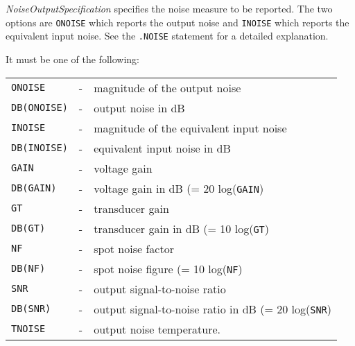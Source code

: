 \begin{widelist}
\item[{\it NoiseOutputSpecification}]
     specifies the noise measure to be reported. The two options are
     {\tt ONOISE} which reports the output noise and
     {\tt INOISE} which reports the equivalent input noise.
     See the {\tt .NOISE} statement
     for a detailed explanation.

     It  must be one of the following:\\
      \offset\begin{tabular}{lcp{3.5in}}
      {\tt ONOISE} &-&magnitude of the output noise\\
      {\tt DB(ONOISE)} &-&output noise in dB\\
      {\tt INOISE} &-&magnitude of the equivalent input noise\\
      {\tt DB(INOISE)} &-&equivalent input noise in dB\\
      {\tt GAIN} &-&voltage gain\\
      {\tt DB(GAIN)} &-&voltage gain in dB (= 20 log({\tt GAIN})\\
      {\tt GT} &-&transducer gain\\
      {\tt DB(GT)} &-&transducer gain in dB (= 10 log({\tt GT})\\
      {\tt NF} &-&spot noise factor\\
      {\tt DB(NF)} &-& spot noise figure (= 10 log({\tt NF})\\
      {\tt SNR} &-&output signal-to-noise ratio\\
      {\tt DB(SNR)} &-&output signal-to-noise ratio in dB (= 20 log({\tt SNR})\\
      {\tt TNOISE} &-&output noise temperature.
      \end{tabular}
\end{widelist}

